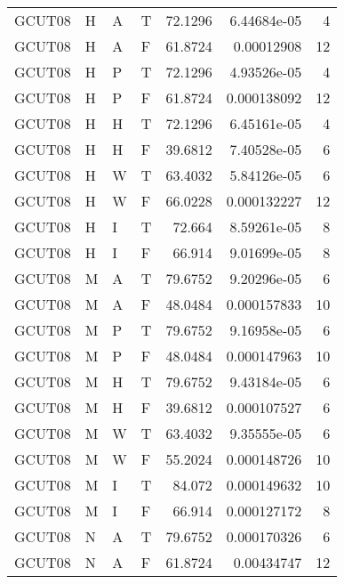 \begin{longtable}{llllrrr}
    GCUT08   & H     & A     & T          & 72.1296    & 6.44684e-05 & 4        \\
    GCUT08   & H     & A     & F          & 61.8724    & 0.00012908  & 12       \\
    GCUT08   & H     & P     & T          & 72.1296    & 4.93526e-05 & 4        \\
    GCUT08   & H     & P     & F          & 61.8724    & 0.000138092 & 12       \\
    GCUT08   & H     & H     & T          & 72.1296    & 6.45161e-05 & 4        \\
    GCUT08   & H     & H     & F          & 39.6812    & 7.40528e-05 & 6        \\
    GCUT08   & H     & W     & T          & 63.4032    & 5.84126e-05 & 6        \\
    GCUT08   & H     & W     & F          & 66.0228    & 0.000132227 & 12       \\
    GCUT08   & H     & I     & T          & 72.664     & 8.59261e-05 & 8        \\
    GCUT08   & H     & I     & F          & 66.914     & 9.01699e-05 & 8        \\
    GCUT08   & M     & A     & T          & 79.6752    & 9.20296e-05 & 6        \\
    GCUT08   & M     & A     & F          & 48.0484    & 0.000157833 & 10       \\
    GCUT08   & M     & P     & T          & 79.6752    & 9.16958e-05 & 6        \\
    GCUT08   & M     & P     & F          & 48.0484    & 0.000147963 & 10       \\
    GCUT08   & M     & H     & T          & 79.6752    & 9.43184e-05 & 6        \\
    GCUT08   & M     & H     & F          & 39.6812    & 0.000107527 & 6        \\
    GCUT08   & M     & W     & T          & 63.4032    & 9.35555e-05 & 6        \\
    GCUT08   & M     & W     & F          & 55.2024    & 0.000148726 & 10       \\
    GCUT08   & M     & I     & T          & 84.072     & 0.000149632 & 10       \\
    GCUT08   & M     & I     & F          & 66.914     & 0.000127172 & 8        \\
    GCUT08   & N     & A     & T          & 79.6752    & 0.000170326 & 6        \\
    GCUT08   & N     & A     & F          & 61.8724    & 0.00434747  & 12       \\

\end{longtable}
